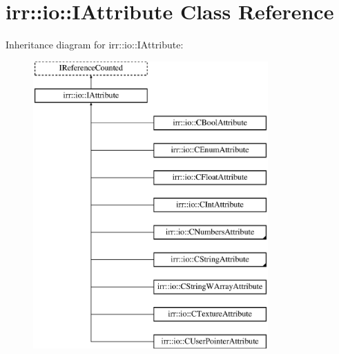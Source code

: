 \hypertarget{classirr_1_1io_1_1_i_attribute}{\section{irr\-:\-:io\-:\-:I\-Attribute Class Reference}
\label{classirr_1_1io_1_1_i_attribute}
}
Inheritance diagram for irr\-:\-:io\-:\-:I\-Attribute\-:\begin{figure}[H]
\begin{center}
\leavevmode
\includegraphics[height=11.000000cm]{classirr_1_1io_1_1_i_attribute}
\end{center}
\end{figure}
